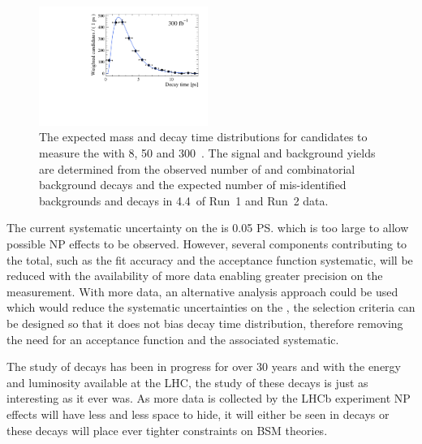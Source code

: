 \begin{figure}[tbp]
        \includegraphics[width=0.49\textwidth]{./Figs/Summary/300fb_time.pdf}
    \caption{The expected mass and decay time distributions for \bsmumu candidates to measure the \el with 8, 50 and 300~\fb. The signal and background yields are determined from the observed number of \bsmumu and combinatorial background decays and the expected number of mis-identified backgrounds and \bdmumu decays in 4.4~\fb of Run~1 and Run~2 data.}
    \label{fig:expected_dist}
\end{figure}





The current systematic uncertainty on the \el is 0.05 \ps which is too large to allow possible NP effects to be observed. However, several components contributing to the total, such as the fit accuracy and the acceptance function systematic, will be reduced with the availability of more data enabling greater precision on the measurement. With more data, an alternative analysis approach could be used which would reduce the systematic uncertainties on the \el, the selection criteria can be designed so that it does not bias \bsmumu decay time distribution, therefore removing the need for an acceptance function and the associated systematic.


The study of \bmumu decays has been in progress for over 30 years and with the energy and luminosity available at the LHC, the study of these decays is just as interesting as it ever was. As more data is collected by the LHCb experiment NP effects will have less and less space to hide, it will either be seen in \bmumu decays or these decays will place ever tighter constraints on BSM theories. 
